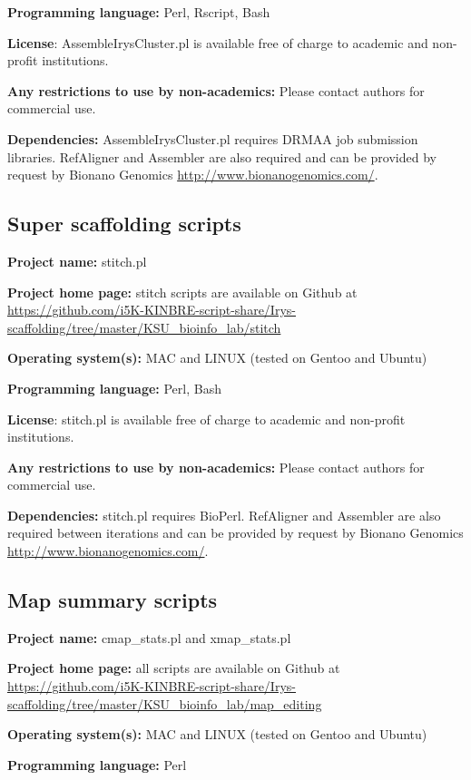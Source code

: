 \documentclass{bmcart}
\begin{document}
\textbf{Programming language:} Perl, Rscript, Bash

\textbf{License}: AssembleIrysCluster.pl is available free of charge to academic and non-profit institutions.

\textbf{Any restrictions to use by non-academics:} Please contact authors for commercial use.

\textbf{Dependencies:} AssembleIrysCluster.pl requires DRMAA job submission libraries. RefAligner and Assembler are also required and can be provided by request by Bionano Genomics \url{http://www.bionanogenomics.com/}.

\subsection*{\textbf{Super scaffolding scripts}}

\textbf{Project name:} stitch.pl

\textbf{Project home page:} stitch scripts are available on Github at \url{https://github.com/i5K-KINBRE-script-share/Irys-scaffolding/tree/master/KSU\_bioinfo\_lab/stitch}

\textbf{Operating system(s):} MAC and LINUX (tested on Gentoo and Ubuntu)

\textbf{Programming language:} Perl, Bash

\textbf{License}: stitch.pl is available free of charge to academic and non-profit institutions.

\textbf{Any restrictions to use by non-academics:} Please contact authors for commercial use.

\textbf{Dependencies:} stitch.pl requires BioPerl. RefAligner and Assembler are also required between iterations and can be provided by request by Bionano Genomics \url{http://www.bionanogenomics.com/}.

\subsection*{\textbf{Map summary scripts}}

\textbf{Project name:} cmap\_stats.pl and xmap\_stats.pl

\textbf{Project home page:} all scripts are available on Github at \url{https://github.com/i5K-KINBRE-script-share/Irys-scaffolding/tree/master/KSU\_bioinfo\_lab/map\_editing}

\textbf{Operating system(s):} MAC and LINUX (tested on Gentoo and Ubuntu)

\textbf{Programming language:} Perl
\end{document}
